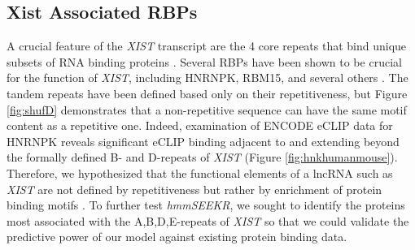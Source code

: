 \subsection{Xist Associated RBPs}
A crucial feature of the \emph{XIST} transcript are the 4 core repeats that bind unique subsets of RNA binding proteins \cite{Sunwoo2017RepeatCIZ1,Zhao2008PolycombChromosome,Pintacuda2017HnRNPKSilencing,Wang2017TargetingGuanines,Hoki2009AMouse}. Several RBPs have been shown to be crucial for the function of \emph{XIST}, including HNRNPK, RBM15, and several others \cite{Sunwoo2017RepeatCIZ1,Zhao2008PolycombChromosome,Pintacuda2017HnRNPKSilencing,Wang2017TargetingGuanines,Hoki2009AMouse,Chu2015SystematicProteins}. The tandem repeats have been defined based only on their repetitiveness, but Figure \ref{fig:shufD} demonstrates that a non-repetitive sequence can have the same motif content as a repetitive one. Indeed, examination of ENCODE eCLIP data for HNRNPK reveals significant eCLIP binding adjacent to and extending beyond the formally defined B- and D-repeats of \emph{XIST} (Figure \ref{fig:hnkhumanmouse}). Therefore, we hypothesized that the functional elements of a lncRNA such as \emph{XIST} are not defined by repetitiveness but rather by enrichment of protein binding motifs \cite{Kirk2018FunctionalContent,Sprague2019NonlinearDomains,Dominguez2018SequenceProteins,Ray2013ARegulation,Wang2017TargetingGuanines}. To further test \emph{hmmSEEKR}, we sought to identify the proteins most associated with the A,B,D,E-repeats of \emph{XIST} so that we could validate the predictive power of our model against existing protein binding data.
